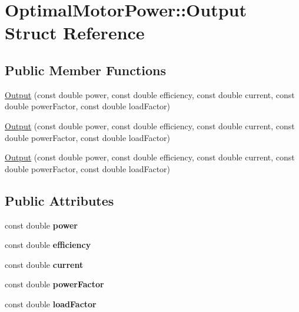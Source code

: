\hypertarget{struct_optimal_motor_power_1_1_output}{}\section{Optimal\+Motor\+Power\+:\+:Output Struct Reference}
\label{struct_optimal_motor_power_1_1_output}
\subsection*{Public Member Functions}
\begin{DoxyCompactItemize}
\item 
\hyperlink{struct_optimal_motor_power_1_1_output_abbafcda40828d58548d0245d45cd7477}{Output} (const double power, const double efficiency, const double current, const double power\+Factor, const double load\+Factor)
\item 
\hyperlink{struct_optimal_motor_power_1_1_output_abbafcda40828d58548d0245d45cd7477}{Output} (const double power, const double efficiency, const double current, const double power\+Factor, const double load\+Factor)
\item 
\hyperlink{struct_optimal_motor_power_1_1_output_abbafcda40828d58548d0245d45cd7477}{Output} (const double power, const double efficiency, const double current, const double power\+Factor, const double load\+Factor)
\end{DoxyCompactItemize}
\subsection*{Public Attributes}
\begin{DoxyCompactItemize}
\item 
\mbox{\label{struct_optimal_motor_power_1_1_output_a2848225247934e5029fe3748e9c96682}} 
const double {\bfseries power}
\item 
\mbox{\label{struct_optimal_motor_power_1_1_output_ae7a0621dd6230bd92ebcba7ce81b12c6}} 
const double {\bfseries efficiency}
\item 
\mbox{\label{struct_optimal_motor_power_1_1_output_ae096d9691f71779d58f3f17e7faf5c00}} 
const double {\bfseries current}
\item 
\mbox{\label{struct_optimal_motor_power_1_1_output_aa02432d4d75c11c7e0050546d6f8d92c}} 
const double {\bfseries power\+Factor}
\item 
\mbox{\label{struct_optimal_motor_power_1_1_output_a7e7a6a07ece8a9332a19437ffee19730}} 
const double {\bfseries load\+Factor}
\end{DoxyCompactItemize}


